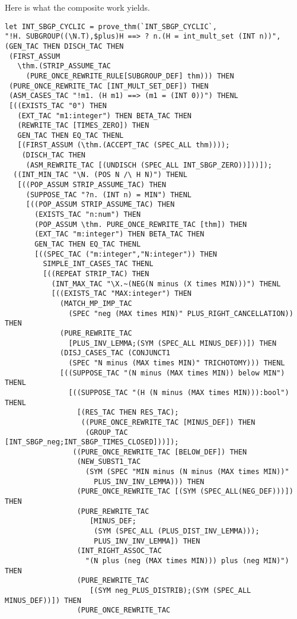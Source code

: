Here is what the composite work yields.
\begin{verbatim}
let INT_SBGP_CYCLIC = prove_thm(`INT_SBGP_CYCLIC`,
"!H. SUBGROUP((\N.T),$plus)H ==> ? n.(H = int_mult_set (INT n))",
(GEN_TAC THEN DISCH_TAC THEN
 (FIRST_ASSUM
   \thm.(STRIP_ASSUME_TAC
     (PURE_ONCE_REWRITE_RULE[SUBGROUP_DEF] thm))) THEN
 (PURE_ONCE_REWRITE_TAC [INT_MULT_SET_DEF]) THEN
 (ASM_CASES_TAC "!m1. (H m1) ==> (m1 = (INT 0))") THENL
 [((EXISTS_TAC "0") THEN
   (EXT_TAC "m1:integer") THEN BETA_TAC THEN
   (REWRITE_TAC [TIMES_ZERO]) THEN
   GEN_TAC THEN EQ_TAC THENL
   [(FIRST_ASSUM (\thm.(ACCEPT_TAC (SPEC_ALL thm))));
    (DISCH_TAC THEN
     (ASM_REWRITE_TAC [(UNDISCH (SPEC_ALL INT_SBGP_ZERO))]))]);
  ((INT_MIN_TAC "\N. (POS N /\ H N)") THENL
   [((POP_ASSUM STRIP_ASSUME_TAC) THEN
     (SUPPOSE_TAC "?n. (INT n) = MIN") THENL
     [((POP_ASSUM STRIP_ASSUME_TAC) THEN
       (EXISTS_TAC "n:num") THEN
       (POP_ASSUM \thm. PURE_ONCE_REWRITE_TAC [thm]) THEN
       (EXT_TAC "m:integer") THEN BETA_TAC THEN
       GEN_TAC THEN EQ_TAC THENL
       [((SPEC_TAC ("m:integer","N:integer")) THEN
         SIMPLE_INT_CASES_TAC THENL
         [((REPEAT STRIP_TAC) THEN
           (INT_MAX_TAC "\X.~(NEG(N minus (X times MIN)))") THENL
           [((EXISTS_TAC "MAX:integer") THEN
             (MATCH_MP_IMP_TAC
               (SPEC "neg (MAX times MIN)" PLUS_RIGHT_CANCELLATION)) THEN
             (PURE_REWRITE_TAC
               [PLUS_INV_LEMMA;(SYM (SPEC_ALL MINUS_DEF))]) THEN
             (DISJ_CASES_TAC (CONJUNCT1
               (SPEC "N minus (MAX times MIN)" TRICHOTOMY))) THENL
             [((SUPPOSE_TAC "(N minus (MAX times MIN)) below MIN") THENL
               [((SUPPOSE_TAC "(H (N minus (MAX times MIN))):bool") THENL
                 [(RES_TAC THEN RES_TAC);
                  ((PURE_ONCE_REWRITE_TAC [MINUS_DEF]) THEN
                   (GROUP_TAC [INT_SBGP_neg;INT_SBGP_TIMES_CLOSED]))]);
                ((PURE_ONCE_REWRITE_TAC [BELOW_DEF]) THEN
                 (NEW_SUBST1_TAC 
                   (SYM (SPEC "MIN minus (N minus (MAX times MIN))"
                     PLUS_INV_INV_LEMMA))) THEN
                 (PURE_ONCE_REWRITE_TAC [(SYM (SPEC_ALL(NEG_DEF)))]) THEN
                 (PURE_REWRITE_TAC
                    [MINUS_DEF;
                     (SYM (SPEC_ALL (PLUS_DIST_INV_LEMMA)));
                     PLUS_INV_INV_LEMMA]) THEN
                 (INT_RIGHT_ASSOC_TAC
                   "(N plus (neg (MAX times MIN))) plus (neg MIN)") THEN
                 (PURE_REWRITE_TAC
                    [(SYM neg_PLUS_DISTRIB);(SYM (SPEC_ALL MINUS_DEF))]) THEN
                 (PURE_ONCE_REWRITE_TAC

\end{verbatim}
